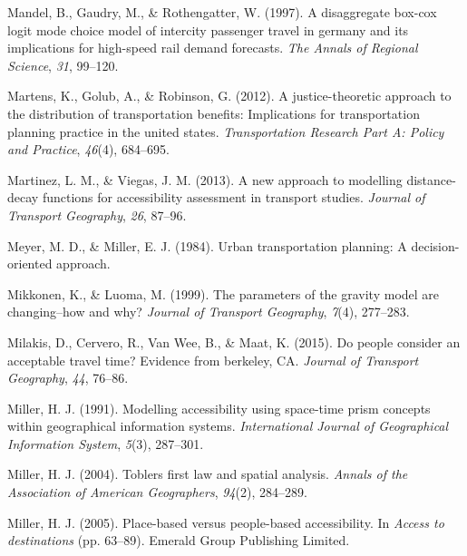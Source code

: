 \documentclass[
11pt, %
oneside, %
english, %
singlespacing, %
]{macthesis} %
\newlength{\cslhangindent}
\newenvironment{CSLReferences}[2] %
 {%
  \setlength{\parindent}{0pt}
  \ifodd #1 \everypar{\setlength{\hangindent}{\cslhangindent}}\ignorespaces\fi
  \ifnum #2 > 0
  \setlength{\parskip}{#2\baselineskip}
  \fi
 }%
 {}
\begin{document}
\begin{CSLReferences}{1}{0}
\leavevmode{}%
Mandel, B., Gaudry, M., \& Rothengatter, W. (1997). A disaggregate box-cox logit mode choice model of intercity passenger travel in germany and its implications for high-speed rail demand forecasts. \emph{The Annals of Regional Science}, \emph{31}, 99--120.

\leavevmode{}%
Martens, K., Golub, A., \& Robinson, G. (2012). A justice-theoretic approach to the distribution of transportation benefits: Implications for transportation planning practice in the united states. \emph{Transportation Research Part A: Policy and Practice}, \emph{46}(4), 684--695.

\leavevmode{}%
Martinez, L. M., \& Viegas, J. M. (2013). A new approach to modelling distance-decay functions for accessibility assessment in transport studies. \emph{Journal of Transport Geography}, \emph{26}, 87--96.

\leavevmode{}%
Meyer, M. D., \& Miller, E. J. (1984). Urban transportation planning: A decision-oriented approach.

\leavevmode{}%
Mikkonen, K., \& Luoma, M. (1999). The parameters of the gravity model are changing--how and why? \emph{Journal of Transport Geography}, \emph{7}(4), 277--283.

\leavevmode{}%
Milakis, D., Cervero, R., Van Wee, B., \& Maat, K. (2015). Do people consider an acceptable travel time? Evidence from berkeley, CA. \emph{Journal of Transport Geography}, \emph{44}, 76--86.

\leavevmode{}%
Miller, H. J. (1991). Modelling accessibility using space-time prism concepts within geographical information systems. \emph{International Journal of Geographical Information System}, \emph{5}(3), 287--301.

\leavevmode{}%
Miller, H. J. (2004). Toblers first law and spatial analysis. \emph{Annals of the Association of American Geographers}, \emph{94}(2), 284--289.

\leavevmode{}%
Miller, H. J. (2005). Place-based versus people-based accessibility. In \emph{Access to destinations} (pp. 63--89). Emerald Group Publishing Limited.


\end{CSLReferences}
\end{document}
